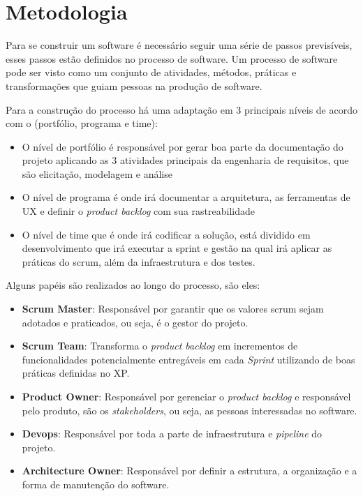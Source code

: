 \chapter{Metodologia}

Para se construir um software é necessário seguir uma série de passos previsíveis, esses passos estão definidos no processo de software. Um processo de software pode ser visto como um conjunto de atividades, métodos, práticas e transformações que guiam pessoas na produção de software.

Para a construção do processo há uma adaptação em 3 principais níveis de acordo com o \cite{safe} (portfólio, programa e time):

\begin{itemize}
  \item O nível de portfólio é responsável por gerar boa parte da documentação do projeto aplicando as 3 atividades principais da engenharia de requisitos, que são elicitação, modelagem e análise
  \item O nível de programa é onde irá documentar a arquitetura, as ferramentas de UX e definir o \textit{product backlog} com sua rastreabilidade
  \item O nível de time que é onde irá codificar a solução, está dividido em desenvolvimento que irá executar a sprint e gestão na qual irá aplicar as práticas do scrum, além da infraestrutura e dos testes.
\end{itemize}

Alguns papéis são realizados ao longo do processo, são eles:

\begin{itemize}
  \item \textbf{Scrum Master}: Responsável por garantir que os valores scrum sejam adotados e praticados, ou seja, é o gestor do projeto.
  \item \textbf{Scrum Team}: Transforma o \textit{product backlog} em incrementos de funcionalidades potencialmente entregáveis em cada \textit{Sprint} utilizando de boas práticas definidas no XP.
  \item \textbf{Product Owner}: Responsável por gerenciar o \textit{product backlog} e responsável pelo produto, são os \textit{stakeholders}, ou seja, as pessoas interessadas no software.
  \item \textbf{Devops}: Responsável por toda a parte de infraestrutura e \textit{pipeline} do projeto.
  \item \textbf{Architecture Owner}: Responsável por definir a estrutura, a organização e a forma de manutenção do software.
\end{itemize}

